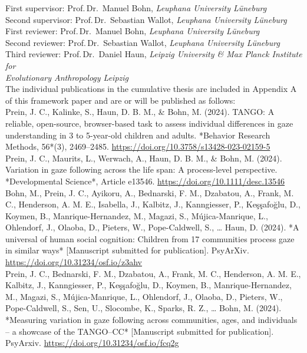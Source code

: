 \documentclass[
]{scrbook}
\begin{document}
\begin{titlepage}
\begin{flushleft}
\begin{normalsize}
            First supervisor: \tabto*{45mm} Prof.\,Dr.\, Manuel Bohn, \textit{Leuphana University Lüneburg}\\
                Second supervisor: \tabto*{45mm} Prof.\,Dr.\, Sebastian Wallot, \textit{Leuphana University Lüneburg}\\[5mm]
                First reviewer: \tabto*{45mm} Prof.\,Dr.\, Manuel Bohn, \textit{Leuphana University Lüneburg}\\
                Second reviewer: \tabto*{45mm} Prof.\,Dr.\, Sebastian Wallot, \textit{Leuphana University Lüneburg}\\
                Third reviewer: \tabto*{45mm} Prof.\,Dr.\, Daniel Haun, \textit{Leipzig University \& Max Planck Institute for\\
                \tabto*{45mm} Evolutionary Anthropology Leipzig}\\[10mm]
                
                The individual publications in the cumulative thesis are included in Appendix A of this framework paper and are or will be published as follows: \\[5mm]

Prein, J. C., Kalinke, S., Haun, D. B. M.\*, \& Bohn, M.\* (2024). TANGO: A reliable, open-source, browser-based task to assess individual differences in gaze understanding in 3 to 5-year-old children and adults. *Behavior Research Methods, 56*(3), 2469–2485. \mbox{\url{https://doi.org/10.3758/s13428-023-02159-5}} \\[5mm]

Prein, J. C., Maurits, L., Werwach, A., Haun, D. B. M.,\* \& Bohn, M.\* (2024). Variation in gaze following across the life span: A process-level perspective. *Developmental Science*, Article e13546. \mbox{\url{https://doi.org/10.1111/desc.13546}} \\[5mm]

Bohn, M.\*, Prein, J. C.\*, Ayikoru, A., Bednarski, F. M., Dzabatou, A., Frank, M. C., Henderson, A. M. E., Isabella, J., Kalbitz, J., Kanngiesser, P., Keşşafoğlu, D., Koymen, B., Manrique-Hernandez, M., Magazi, S., Mújica-Manrique, L., Ohlendorf, J., Olaoba, D., Pieters, W., Pope-Caldwell, S., … Haun, D. (2024). *A universal of human social cognition: Children from 17 communities process gaze in similar ways* [Manuscript submitted for publication]. PsyArXiv. \mbox{\url{https://doi.org/10.31234/osf.io/z3ahv}} \\[5mm]

Prein, J. C., Bednarski, F. M., Dzabatou, A., Frank, M. C., Henderson, A. M. E., Kalbitz, J., Kanngiesser, P., Keşşafoğlu, D., Koymen, B., Manrique-Hernandez, M., Magazi, S., Mújica-Manrique, L., Ohlendorf, J., Olaoba, D., Pieters, W., Pope-Caldwell, S., Sen, U., Slocombe, K., Sparks, R. Z., … Bohn, M. (2024). *Measuring variation in gaze following across communities, ages, and individuals – a showcase of the TANGO–CC* [Manuscript submitted for publication]. PsyArxiv. \mbox{\url{https://doi.org/10.31234/osf.io/fcq2g}} \\[10mm]
                

\end{normalsize}
\end{flushleft}
\end{titlepage}
\end{document}
